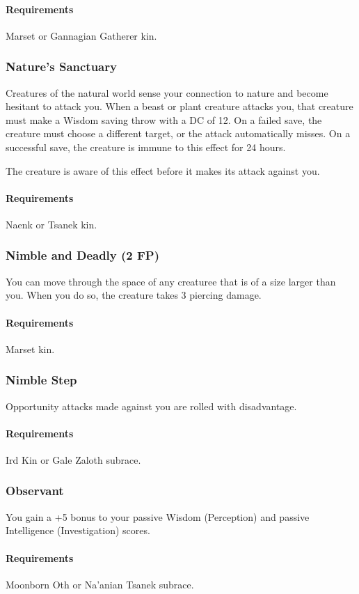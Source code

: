     \paragraph{Requirements} Marset or Gannagian Gatherer kin.
\subsubsection{Nature's Sanctuary} \label{feat::naturessanctuary}
    Creatures of the natural world sense your connection to nature and become hesitant to attack you.
    When a beast or plant creature attacks you, that creature must make a Wisdom saving throw with a DC of 12.
    On a failed save, the creature must choose a different target, or the attack automatically misses.
    On a successful save, the creature is immune to this effect for 24 hours.

    The creature is aware of this effect before it makes its attack against you.
    \paragraph{Requirements} Naenk or Tsanek kin.
\subsubsection{Nimble and Deadly (2 FP)} \label{feat::nimbleanddeadly}
    You can move through the space of any creaturee that is of a size larger than you.
    When you do so, the creature takes 3 piercing damage.
    \paragraph{Requirements} Marset kin.
\subsubsection{Nimble Step} \label{feat::nimblestep}
    Opportunity attacks made against you are rolled with disadvantage.
    \paragraph{Requirements} Ird Kin or Gale Zaloth subrace.
\subsubsection{Observant} \label{feat::observant}
    You gain a +5 bonus to your passive Wisdom (Perception) and passive Intelligence (Investigation) scores.
    \paragraph{Requirements} Moonborn Oth or Na'anian Tsanek subrace.
